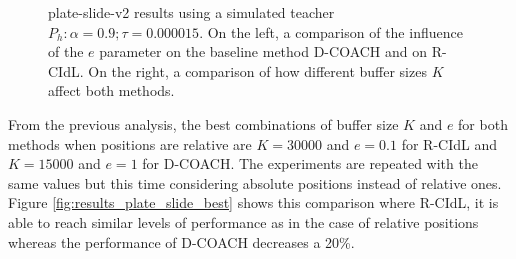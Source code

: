  \begin{figure}[htpb]
  \centering
   \hfill
  \caption{plate-slide-v2 results using a simulated teacher $P_h: \alpha = 0.9; \tau =  0.000015$. On the left, a comparison of the influence of the $e$ parameter on the baseline method D-COACH and on R-CIdL. On the right, a comparison of how different buffer sizes $K$ affect both methods.}
  \label{fig:results_plate_slide_buffer_e}
\end{figure}


      
From the previous analysis, the best combinations of buffer size $K$ and $e$ for both methods when positions are relative are $K=30000$ and $e=0.1$ for R-CIdL and $K=15000$ and $e=1$ for D-COACH. The experiments are repeated with the same values but this time considering absolute positions instead of relative ones. Figure \ref{fig:results_plate_slide_best} shows this comparison where R-CIdL, it is able to reach similar levels of performance as in the case of relative positions whereas the performance of D-COACH decreases a 20\%.



